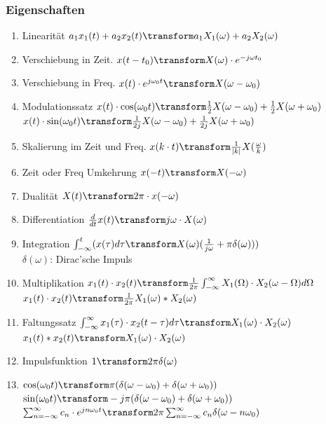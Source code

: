 \subsubsection{Eigenschaften}
\begin{enumerate}[nosep]
	\item Linearität $a_1x_1(t) + a_2x_2(t) \transform a_1X_1(\omega) + a_2X_2(\omega)$ 
	\item Verschiebung in Zeit. $x(t - t_0) \transform X(\omega) \cdot e^{-j\omega t_0}$
	\item Verschiebung in Freq. $x(t) \cdot e^{j\omega_0 t} \transform X(\omega - \omega_0)$
	\item Modulationssatz $x(t) \cdot \cos(\omega_0t) \transform \frac{1}{2}X(\omega - \omega_0) + \frac{1}{2}X(\omega + \omega_0)$ \\ $x(t) \cdot \sin(\omega_0t) \transform \frac{1}{2j}X(\omega - \omega_0) + \frac{1}{2j}X(\omega + \omega_0)$ 
	\item Skalierung im Zeit und Freq. $x(k\cdot t) \transform \frac{1}{|k|}X(\frac{\omega}{k})$
	\item Zeit oder Freq Umkehrung $x(-t) \transform X(-\omega)$
	\item Dualität $X(t) \transform 2\pi \cdot x(-\omega)$
	\item Differentiation $\frac{d}{dt}x(t) \transform j\omega \cdot X(\omega)$
	\item Integration $\int_{-\infty}^{t}(x(\tau)d\tau \transform X(\omega)(\frac{1}{j\omega} + \pi \delta(\omega)))$ \\ $\delta(\omega)$: Dirac'sche Impuls
	\item Multiplikation $x_1(t) \cdot x_2(t) \transform \frac{1}{2\pi}\int_{-\infty}^{\infty}X_1(\Omega) \cdot X_2(\omega - \Omega)d\Omega$ \\
	$x_1(t) \cdot x_2(t) \transform \frac{1}{2\pi}X_1(\omega) * X_2(\omega)$
	\item Faltungssatz $\int_{-\infty}^{\infty}x_1(\tau) \cdot x_2(t - \tau)d\tau \transform X_1(\omega) \cdot X_2(\omega)$ \\
	$x_1(t) * x_2(t) \transform X_1(\omega) \cdot X_2(\omega)$
	\item Impulsfunktion $1 \transform 2\pi\delta(\omega)$
	\item $\cos(\omega_0 t) \transform \pi (\delta(\omega - \omega_0) + \delta(\omega + \omega_0))$ \\
	$\sin(\omega_0 t) \transform -j\pi (\delta(\omega - \omega_0) + \delta(\omega + \omega_0))$ \\
	$\sum_{n=-\infty}^{\infty}c_n\cdot e^{jn\omega_0 t} \transform 2\pi \sum_{n=-\infty}^{\infty}c_n \delta (\omega - n \omega_0)$
\end{enumerate}


